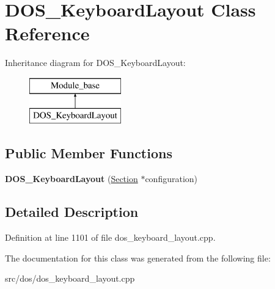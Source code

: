 \hypertarget{classDOS__KeyboardLayout}{\section{D\-O\-S\-\_\-\-Keyboard\-Layout Class Reference}
\label{classDOS__KeyboardLayout}
}
Inheritance diagram for D\-O\-S\-\_\-\-Keyboard\-Layout\-:\begin{figure}[H]
\begin{center}
\leavevmode
\includegraphics[height=2.000000cm]{classDOS__KeyboardLayout}
\end{center}
\end{figure}
\subsection*{Public Member Functions}
\begin{DoxyCompactItemize}
\item 
\hypertarget{classDOS__KeyboardLayout_a794faca95d191a599d107822832a037d}{{\bfseries D\-O\-S\-\_\-\-Keyboard\-Layout} (\hyperlink{classSection}{Section} $\ast$configuration)}\label{classDOS__KeyboardLayout_a794faca95d191a599d107822832a037d}

\end{DoxyCompactItemize}


\subsection{Detailed Description}


Definition at line 1101 of file dos\-\_\-keyboard\-\_\-layout.\-cpp.



The documentation for this class was generated from the following file\-:\begin{DoxyCompactItemize}
\item 
src/dos/dos\-\_\-keyboard\-\_\-layout.\-cpp\end{DoxyCompactItemize}
